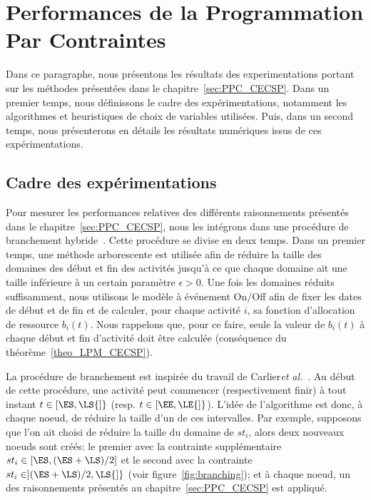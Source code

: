 \section{Performances de la Programmation Par Contraintes}

Dans ce paragraphe, nous présentons les résultats des experimentations
portant sur les méthodes présentées dans le
chapitre~\ref{sec:PPC_CECSP}. Dans un premier temps, nous définissons
le cadre des expérimentations, notamment les algorithmes et
heuristiques de choix de variables utilisées. Puis, dans un second
temps, nous présenterons en détails les résultats numériques issus de
ces expérimentations. 

\subsection{Cadre des expérimentations}
\label{sec:hybridBB}
Pour mesurer les performances relatives des différents raisonnements
présentés dans le chapitre~\ref{sec:PPC_CECSP}, nous les intégrons
dans une procédure de branchement
hybride~\cite{Nattaf_Constraints,Nattaf_ORSpectrum}. Cette procédure
se divise en deux temps. Dans un premier temps, une méthode 
arborescente est utilisée afin de réduire la taille des domaines des
début et fin des activités jusqu'à ce que chaque domaine ait une
taille inférieure à un certain paramètre $\epsilon >0$. Une fois les
domaines réduits suffisamment, nous utilisons le modèle à événement
On/Off afin de fixer les dates de début et de fin et de calculer, pour
chaque activité $i$, sa fonction d'allocation de ressource
$b_i(t)$. Nous rappelons que, pour ce faire, seule la valeur de
$b_i(t)$ à chaque début et fin d'activité doit être calculée
(conséquence du théorème~\ref{theo_LPM_CECSP}).

La procédure de branchement est inspirée du travail de Carlier{\it et
  al.}~\cite{Carlier}. Au début de cette procédure, une activité peut
commencer (respectivement finir) à tout instant $t \in [\ES,\LS{]}$
(resp. $t \in [\EE,\LE{]}$). L'idée de l'algorithme est donc, à chaque
noeud, de réduire la taille d'un de ces intervalles. Par exemple,
supposons que l'on ait choisi de réduire la taille du domaine de
$st_i$, alors deux nouveaux noeuds sont créés: le premier avec la
contrainte supplémentaire $st_i \in [\ES , (\ES+\LS) / 2]$ et le
second avec la contrainte $st_i \in ](\ES+\LS) / 2,\LS{]}$ (voir
figure~\ref{fig:branching}); et à chaque noeud, un des raisonnements
présentés au chapitre~\ref{sec:PPC_CECSP} est appliqué.

